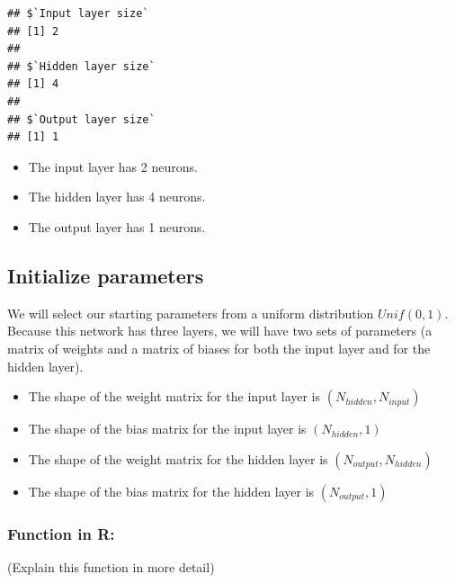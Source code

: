 \documentclass[
]{article}
\providecommand{\tightlist}{%
  \setlength{\itemsep}{0pt}\setlength{\parskip}{0pt}}
\begin{document}
\begin{verbatim}
## $`Input layer size`
## [1] 2
## 
## $`Hidden layer size`
## [1] 4
## 
## $`Output layer size`
## [1] 1
\end{verbatim}

\begin{itemize}
\tightlist
\item
  The input layer has 2 neurons.
\item
  The hidden layer has 4 neurons.
\item
  The output layer has 1 neurons.
\end{itemize}

\hypertarget{initialize-parameters}{%
\subsection{Initialize parameters}\label{initialize-parameters}}

We will select our starting parameters from a uniform distribution
\(Unif(0,1)\).\\
Because this network has three layers, we will have two sets of
parameters (a matrix of weights and a matrix of biases for both the
input layer and for the hidden layer).

\begin{itemize}
\tightlist
\item
  The shape of the weight matrix for the input layer is
  \((N_{hidden},N_{input})\)
\item
  The shape of the bias matrix for the input layer is \((N_{hidden},1)\)
\item
  The shape of the weight matrix for the hidden layer is
  \((N_{output},N_{hidden})\)
\item
  The shape of the bias matrix for the hidden layer is
  \((N_{output},1)\)
\end{itemize}

\hypertarget{function-in-r-1}{%
\subsubsection{Function in R:}\label{function-in-r-1}}

(Explain this function in more detail)
\end{document}
